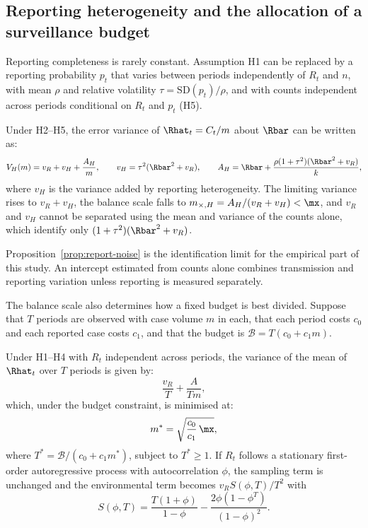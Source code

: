 \subsection{Reporting heterogeneity and the allocation of a surveillance budget}
\label{sec:bg-reporting}

Reporting completeness is rarely constant. Assumption H1 can be replaced by a reporting probability $p_t$ that varies between periods independently of $R_t$ and $n$, with mean $\rho$ and relative volatility $\tau=\mathrm{SD}(p_t)/\rho$, and with counts independent across periods conditional on $R_t$ and $p_t$ (H5).

\begin{proposition}
\label{prop:report-noise}
Under H2--H5, the error variance of $\Rhat_t=C_t/m$ about $\Rbar$ can be written as:
\begin{equation}
  V_H(m)=v_R+v_H+\frac{A_H}{m},\qquad
  v_H=\tau^2(\Rbar^2+v_R),\qquad A_H=\Rbar+\frac{\rho(1+\tau^2)(\Rbar^2+v_R)}{k},
  \label{eq:vH-AH}
\end{equation}
where $v_H$ is the variance added by reporting heterogeneity. The limiting variance rises to $v_R+v_H$, the balance scale falls to $m_{\times,H}=A_H/(v_R+v_H)<\mx$, and $v_R$ and $v_H$ cannot be separated using the mean and variance of the counts alone, which identify only $(1+\tau^2)(\Rbar^2+v_R)$.
\end{proposition}

Proposition~\ref{prop:report-noise} is the identification limit for the empirical part of this study. An intercept estimated from counts alone combines transmission and reporting variation unless reporting is measured separately.

The balance scale also determines how a fixed budget is best divided. Suppose that $T$ periods are observed with case volume $m$ in each, that each period costs $c_0$ and each reported case costs $c_1$, and that the budget is $\mathcal{B}=T(c_0+c_1m)$.

\begin{proposition}
\label{prop:allocation}
Under H1--H4 with $R_t$ independent across periods, the variance of the mean of $\Rhat_t$ over $T$ periods is given by:
\begin{equation}
  \frac{v_R}{T}+\frac{A}{Tm},
  \label{eq:alloc-indep}
\end{equation}
which, under the budget constraint, is minimised at:
\begin{equation}
  m^*=\sqrt{\frac{c_0}{c_1}\,\mx},
  \label{eq:optimal-m}
\end{equation}
where $T^*=\mathcal{B}/(c_0+c_1m^*)$, subject to $T^*\ge1$. If $R_t$ follows a stationary first-order autoregressive process with autocorrelation $\phi$, the sampling term is unchanged and the environmental term becomes $v_RS(\phi,T)/T^2$ with
\begin{equation}
  S(\phi,T)=\frac{T(1+\phi)}{1-\phi}-\frac{2\phi(1-\phi^T)}{(1-\phi)^2}.
  \label{eq:ar-sum}
\end{equation}
\end{proposition}

